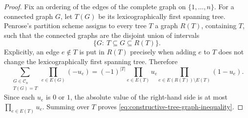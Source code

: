 \begin{proof}
Fix an ordering of the edges of the complete graph on \(\{1,\ldots,n\}\).
For a connected graph \(G\), let \(T(G)\) be its lexicographically first
spanning tree.  Penrose's partition scheme assigns to every tree \(T\) a
graph \(R(T)\), containing \(T\), such that the connected graphs are the
disjoint union of intervals
\[
  \{G:\ T\subseteq G\subseteq R(T)\}.
\]
Explicitly, an edge \(e\notin T\) is put in \(R(T)\) precisely when adding
\(e\) to \(T\) does not change the lexicographically first spanning tree.
Therefore
\[
  \sum_{\substack{G\in\mathcal C_n\\T(G)=T}}
  \prod_{e\in E(G)}(-u_e)
  =
  (-1)^{|T|}
  \prod_{e\in E(T)}u_e
  \prod_{e\in E(R(T))\setminus E(T)}(1-u_e).
\]
Since each \(u_e\) is \(0\) or \(1\), the absolute value of the right-hand
side is at most \(\prod_{e\in E(T)}u_e\).  Summing over \(T\) proves
\eqref{eq:constructive-tree-graph-inequality}.
\end{proof}

